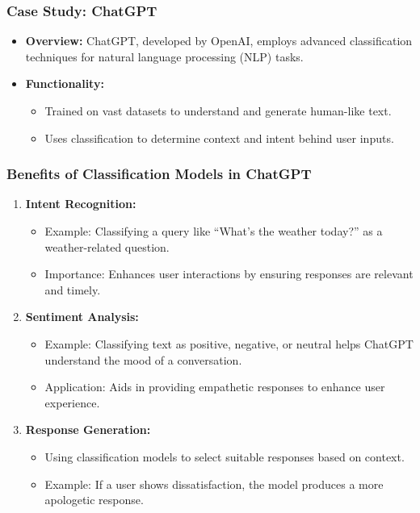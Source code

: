 \documentclass[aspectratio=169]{beamer}
\begin{document}
\begin{frame}
    \frametitle{Case Study: ChatGPT}
    \begin{itemize}
        \item \textbf{Overview:} ChatGPT, developed by OpenAI, employs advanced classification techniques for natural language processing (NLP) tasks.
        \item \textbf{Functionality:}
            \begin{itemize}
                \item Trained on vast datasets to understand and generate human-like text.
                \item Uses classification to determine context and intent behind user inputs.
            \end{itemize}
    \end{itemize}
\end{frame}

\begin{frame}
    \frametitle{Benefits of Classification Models in ChatGPT}
    \begin{enumerate}
        \item \textbf{Intent Recognition:}
            \begin{itemize}
                \item Example: Classifying a query like “What’s the weather today?” as a weather-related question.
                \item Importance: Enhances user interactions by ensuring responses are relevant and timely.
            \end{itemize}

        \item \textbf{Sentiment Analysis:}
            \begin{itemize}
                \item Example: Classifying text as positive, negative, or neutral helps ChatGPT understand the mood of a conversation.
                \item Application: Aids in providing empathetic responses to enhance user experience.
            \end{itemize}

        \item \textbf{Response Generation:}
            \begin{itemize}
                \item Using classification models to select suitable responses based on context.
                \item Example: If a user shows dissatisfaction, the model produces a more apologetic response.
            \end{itemize}
    \end{enumerate}
\end{frame}
\end{document}
